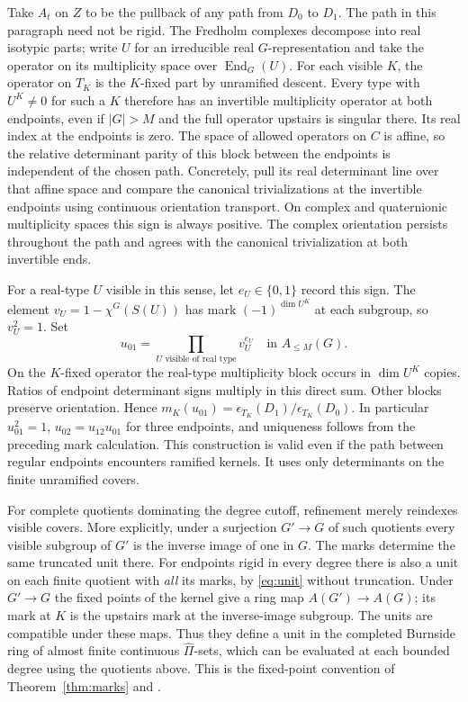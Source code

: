 Take \(A_t\) on \(Z\) to be the pullback of any path from \(D_0\) to \(D_1\). The path in this paragraph need not be rigid. The Fredholm complexes decompose into real isotypic parts; write \(U\) for an irreducible real \(G\)-representation and take the operator on its multiplicity space over \(\operatorname{End}_G(U)\). For each visible \(K\), the operator on \(T_K\) is the \(K\)-fixed part by unramified descent. Every type with \(U^K\ne0\) for such a \(K\) therefore has an invertible multiplicity operator at both endpoints, even if \(|G|>M\) and the full operator upstairs is singular there. Its real index at the endpoints is zero. The space of allowed operators on \(C\) is affine, so the relative determinant parity of this block between the endpoints is independent of the chosen path. Concretely, pull its real determinant line over that affine space and compare the canonical trivializations at the invertible endpoints using continuous orientation transport. On complex and quaternionic multiplicity spaces this sign is always positive. The complex orientation persists throughout the path and agrees with the canonical trivialization at both invertible ends.

For a real-type \(U\) visible in this sense, let \(e_U\in\{0,1\}\) record this sign. The element \(v_U=1-\chi^G(S(U))\) has mark \((-1)^{\dim U^K}\) at each subgroup, so \(v_U^2=1\). Set
\begin{equation}
u_{01}=\prod_{U\text{ visible of real type}}v_U^{e_U}
                      \quad\text{in }A_{\le M}(G).                       \label{eq:unit}
\end{equation}
On the \(K\)-fixed operator the real-type multiplicity block occurs in \(\dim U^K\) copies. Ratios of endpoint determinant signs multiply in this direct sum. Other blocks preserve orientation. Hence \(m_K(u_{01})=\epsilon_{T_K}(D_1)/\epsilon_{T_K}(D_0)\). In particular \(u_{01}^2=1\), \(u_{02}=u_{12}u_{01}\) for three endpoints, and uniqueness follows from the preceding mark calculation. This construction is valid even if the path between regular endpoints encounters ramified kernels. It uses only determinants on the finite unramified covers.

For complete quotients dominating the degree cutoff, refinement merely reindexes visible covers. More explicitly, under a surjection \(G'\to G\) of such quotients every visible subgroup of \(G'\) is the inverse image of one in \(G\). The marks determine the same truncated unit there. For endpoints rigid in every degree there is also a unit on each finite quotient with \emph{all} its marks, by \eqref{eq:unit} without truncation. Under \(G'\to G\) the fixed points of the kernel give a ring map \(A(G')\to A(G)\); its mark at \(K\) is the upstairs mark at the inverse-image subgroup. The units are compatible under these maps. Thus they define a unit in the completed Burnside ring of almost finite continuous \(\widehat\Pi\)-sets, which can be evaluated at each bounded degree using the quotients above. This is the fixed-point convention of Theorem~\ref{thm:marks} and \cite{dress}.


